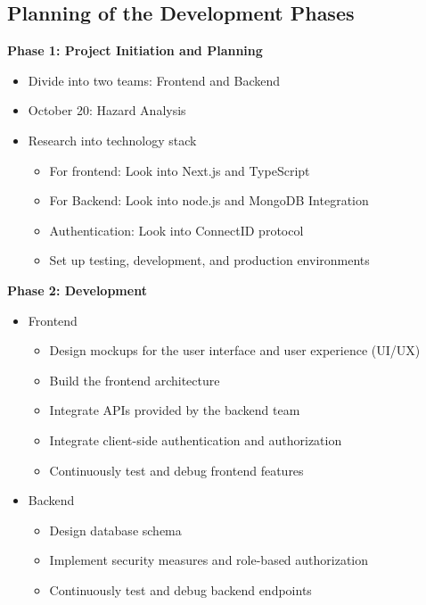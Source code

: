 \documentclass[12pt]{article}
\begin{document}
\subsection{Planning of the Development Phases}

\textbf{Phase 1: Project Initiation and Planning}
\begin{itemize}
    \item Divide into two teams: Frontend and Backend

    \item October 20: Hazard Analysis
    \item Research into technology stack
        \begin{itemize}
            \item For frontend: Look into Next.js and TypeScript
            \item For Backend: Look into node.js and MongoDB Integration
            \item Authentication: Look into ConnectID protocol
            \item Set up testing, development, and production environments
        \end{itemize}
\end{itemize}

\textbf{Phase 2: Development}
\begin{itemize}
    \item Frontend
        \begin{itemize}
            \item Design mockups for the user interface and user experience (UI/UX)
            \item Build the frontend architecture
            \item Integrate APIs provided by the backend team
            \item Integrate client-side authentication and authorization
            \item Continuously test and debug frontend features
        \end{itemize}
    \item Backend
        \begin{itemize}
            \item Design database schema
            \item Implement security measures and role-based authorization
            \item Continuously test and debug backend endpoints
        \end{itemize}
\end{itemize}
\end{document}
